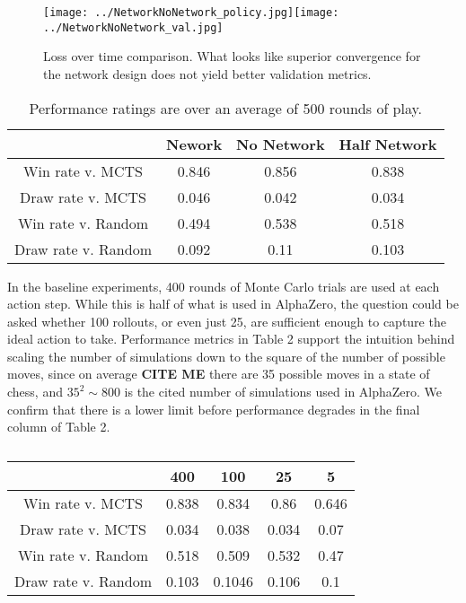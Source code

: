 \documentclass[twoside,11pt]{article}
\begin{document}
\begin{figure}[h]
    \centering
    \texttt{[image: ../NetworkNoNetwork\_policy.jpg]}\texttt{[image: ../NetworkNoNetwork\_val.jpg]}
    \caption{Loss over time comparison. What looks like superior convergence for the network design does not yield 
     better validation metrics.}
\end{figure}

\begin{table}[ht]
\caption{Performance ratings are over an average of 500 rounds of play.}
\begin{center}
    \begin{tabular}{||c ||c c c||} 
    \hline
     & Nework & No Network & Half Network \\ [0.5ex] 
    \hline\hline
    Win rate v. MCTS & 0.846 & 0.856 & 0.838\\ 
    \hline
    Draw rate v. MCTS & 0.046 & 0.042 & 0.034 \\
    \hline
    Win rate v. Random & 0.494 & 0.538 & 0.518 \\
    \hline
    Draw rate v. Random & 0.092 & 0.11 & 0.103 \\
    \hline
   \end{tabular}
   \end{center}
\end{table}

In the baseline experiments, 400 rounds of Monte Carlo trials are used at each 
action step. While this is half of what is used in AlphaZero, the question could
be asked whether 100 rollouts, or even just 25, are sufficient enough to capture
the ideal action to take. Performance metrics in Table 2 support the intuition behind
scaling the number of simulations down to the square of the number of possible moves,
since on average \textbf{CITE ME} there are 35 possible moves in a state of chess, 
and $35^2 \sim 800$ is the cited number of simulations used in AlphaZero. We confirm
that there is a lower limit before performance degrades in the final column of Table 2. 


\begin{table}[ht]
    \caption{}
\begin{center}
    \begin{tabular}{||c c c c c||} 
    \hline
     & 400 & 100 & 25 & 5 \\ [0.5ex] 
    \hline\hline
    Win rate v. MCTS & 0.838 & 0.834 & 0.86 & 0.646\\ 
    \hline
    Draw rate v. MCTS & 0.034 & 0.038 & 0.034 & 0.07\\
    \hline
    Win rate v. Random &  0.518 & 0.509 & 0.532 &0.47\\
    \hline
    Draw rate v. Random & 0.103 & 0.1046 & 0.106 &0.1\\
    \hline
   \end{tabular}
   \end{center}
\end{table}
\end{document}
